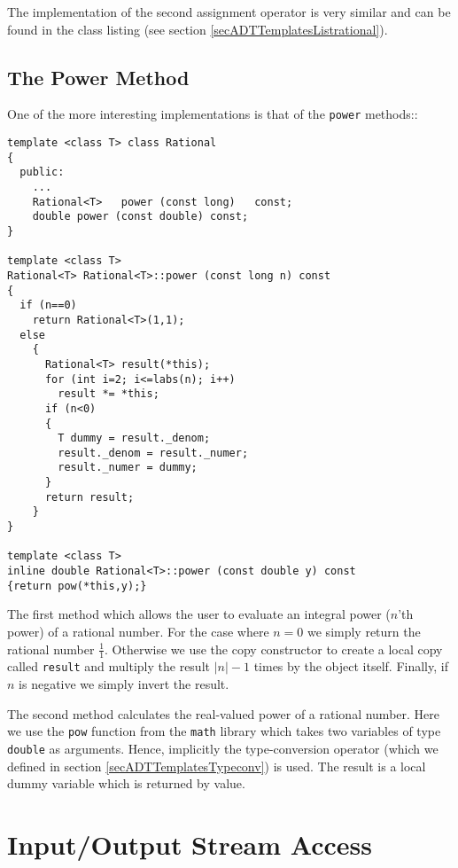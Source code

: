 The implementation of the second assignment operator is very similar
and can be found in the class listing (see section 
\ref{secADTTemplatesListrational}).


\subsection{The Power Method \label{secADTTemplatesPower}}

One of the more interesting implementations is that
of the \verb+power+ methods::
{\footnotesize\begin{verbatim}
template <class T> class Rational
{
  public:
    ...
    Rational<T>   power (const long)   const;
    double power (const double) const;
}

template <class T>
Rational<T> Rational<T>::power (const long n) const
{
  if (n==0)
    return Rational<T>(1,1);
  else
    {
      Rational<T> result(*this);
      for (int i=2; i<=labs(n); i++)
        result *= *this;
      if (n<0)
      {
        T dummy = result._denom;
        result._denom = result._numer;
        result._numer = dummy;
      }
      return result;
    }
}

template <class T>
inline double Rational<T>::power (const double y) const
{return pow(*this,y);}
\end{verbatim}}
The first method which allows the user to evaluate an integral
power ($n$'th power) of a rational number. For the case
where $n\!\!=\!\!0$ we simply return the rational number
$\frac{1}{1}$. Otherwise we use the copy constructor to
create a local copy called \verb+result+ and multiply the
result $|n| \!\! - \!\! 1$ times by the object itself. Finally,
if $n$ is negative we simply invert the result.

The second method calculates the real-valued power
of a rational number. Here we use the \verb+pow+ function
from the \verb+math+ library which takes two variables of
type \verb+double+ as arguments. Hence, implicitly the 
type-conversion operator (which we defined in section
\ref{secADTTemplatesTypeconv}) is used. The result is a local dummy 
variable which is returned by value.


\section{Input/Output Stream Access}

